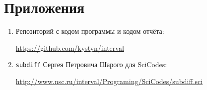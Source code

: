 \section{Приложения} \label{app}

\begin{enumerate}
	\item Репозиторий с кодом программы и кодом отчёта:
	
	\href{https://github.com/kystyn/interval}{https://github.com/kystyn/interval}
	
	\item \texttt{subdiff} Сергея Петровича Шарого для SciCodes:
	
	\href{http://www.nsc.ru/interval/Programing/SciCodes/subdiff.sci}{http://www.nsc.ru/interval/Programing/SciCodes/subdiff.sci}

\end{enumerate}
